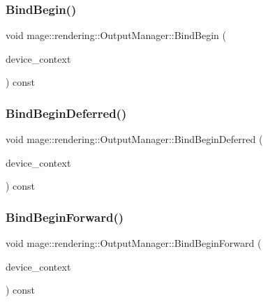 \subsubsection{\texorpdfstring{Bind\+Begin()}{BindBegin()}}
{\footnotesize\ttfamily void mage\+::rendering\+::\+Output\+Manager\+::\+Bind\+Begin (\begin{DoxyParamCaption}\item[{I\+D3\+D11\+Device\+Context \&}]{device\+\_\+context }\end{DoxyParamCaption}) const\hspace{0.3cm}{\ttfamily [noexcept]}}

\hypertarget{classmage_1_1rendering_1_1_output_manager_ad05f55888d2075806ae7a381031ecdfd}{}\label{classmage_1_1rendering_1_1_output_manager_ad05f55888d2075806ae7a381031ecdfd} 
\subsubsection{\texorpdfstring{Bind\+Begin\+Deferred()}{BindBeginDeferred()}}
{\footnotesize\ttfamily void mage\+::rendering\+::\+Output\+Manager\+::\+Bind\+Begin\+Deferred (\begin{DoxyParamCaption}\item[{I\+D3\+D11\+Device\+Context \&}]{device\+\_\+context }\end{DoxyParamCaption}) const\hspace{0.3cm}{\ttfamily [noexcept]}}

\hypertarget{classmage_1_1rendering_1_1_output_manager_a678b86feab6fffb88752254a799d456d}{}\label{classmage_1_1rendering_1_1_output_manager_a678b86feab6fffb88752254a799d456d} 
\subsubsection{\texorpdfstring{Bind\+Begin\+Forward()}{BindBeginForward()}}
{\footnotesize\ttfamily void mage\+::rendering\+::\+Output\+Manager\+::\+Bind\+Begin\+Forward (\begin{DoxyParamCaption}\item[{I\+D3\+D11\+Device\+Context \&}]{device\+\_\+context }\end{DoxyParamCaption}) const\hspace{0.3cm}{\ttfamily [noexcept]}}

